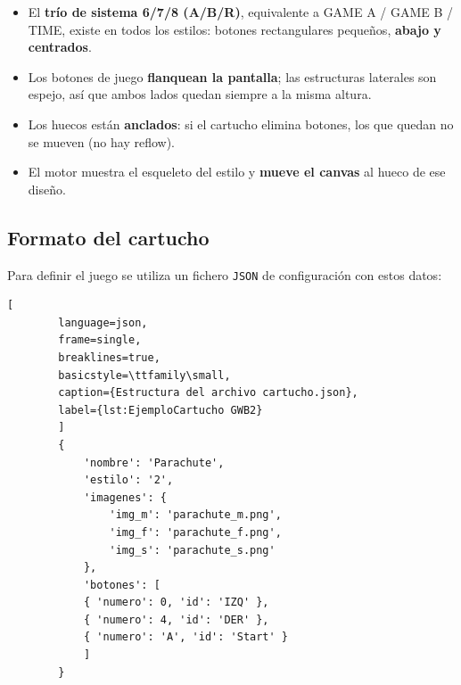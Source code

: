 	\begin{itemize}
		\item El \textbf{trío de sistema 6/7/8 (A/B/R)}, equivalente a GAME A / GAME B / TIME, existe en todos los estilos: botones rectangulares pequeños, \textbf{abajo y centrados}.
		\item Los botones de juego \textbf{flanquean la pantalla}; las estructuras laterales son espejo, así que ambos lados quedan siempre a la misma altura.
		\item Los huecos están \textbf{anclados}: si el cartucho elimina botones, los que quedan no se mueven (no hay reflow).
		\item El motor muestra el esqueleto del estilo y \textbf{mueve el canvas} al hueco de ese diseño.
	\end{itemize}
	
	\subsection{Formato del cartucho}
	
	Para definir el juego se utiliza un fichero \texttt{JSON} de configuración con estos datos:
	
	\begin{lstlisting}[
		language=json, 
		frame=single, 
		breaklines=true, 
		basicstyle=\ttfamily\small,
		caption={Estructura del archivo cartucho.json},
		label={lst:EjemploCartucho GWB2}
		]
		{
			'nombre': 'Parachute',
			'estilo': '2',
			'imagenes': {								 
				'img_m': 'parachute_m.png',	
				'img_f': 'parachute_f.png',
				'img_s': 'parachute_s.png'
			},
			'botones': [
			{ 'numero': 0, 'id': 'IZQ' },
			{ 'numero': 4, 'id': 'DER' },
			{ 'numero': 'A', 'id': 'Start' }		
			]
		}
	\end{lstlisting}
	
